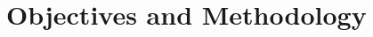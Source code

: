 \chapter{Objectives and Methodology}
\label{chapter:objectives-and-methodology}



%
%
%
%
%
%
%
%
%
